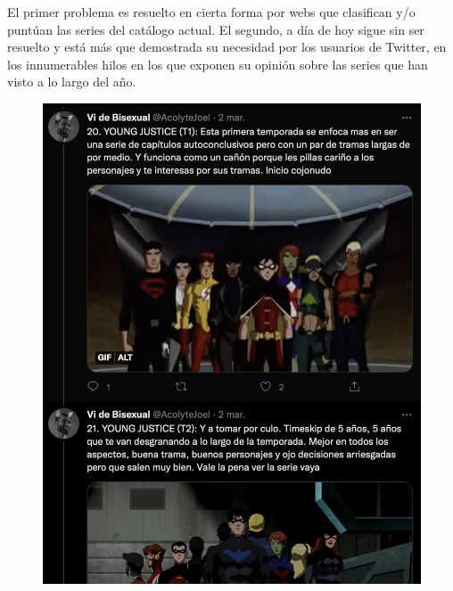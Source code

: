 El primer problema es resuelto en cierta forma por webs que clasifican y/o puntúan las series del catálogo actual. El segundo, a día de hoy sigue sin ser resuelto y está más que demostrada su necesidad por los usuarios de Twitter, en los innumerables hilos en los que exponen su opinión sobre las series que han visto a lo largo del año.
\begin{figure}[]
	\centering	
	\includegraphics[scale=0.25]{img/twitter-thread-1.png}

\end{figure}
